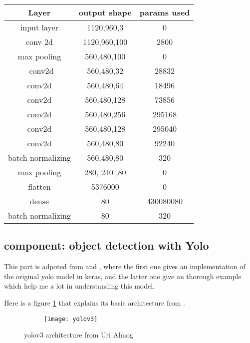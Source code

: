 \documentclass{article}
\begin{document}
\begin{center}
    \begin{tabular}{ccc}
        \hline
        Layer & output shape & params used\\
        \hline 
        input layer & 1120,960,3 & 0\\
        conv 2d & 1120,960,100 & 2800\\
        max pooling & 560,480,100 & 0\\\
        conv2d & 560,480,32& 28832\\
        conv2d & 560,480,64 & 18496\\
        conv2d & 560,480,128 & 73856\\
        conv2d & 560,480,256 & 295168\\
        conv2d & 560,480,128& 295040\\
        conv2d & 560,480,80 & 92240\\
        batch normalizing & 560,480,80 & 320\\
        max pooling & 280, 240 ,80 & 0\\
        flatten & 5376000 & 0\\
        dense & 80 & 430080080 \\
        batch normalizing & 80 & 320       \\\hline
    \end{tabular}
\end{center}

\subsection{component: object detection with Yolo}

This part is adpoted from \cite{anh_yolo3_2022} and \cite{brownlee_how_2019}, where the first one gives an implementation of the original yolo model in keras, and the latter one give an thorough example which help me a lot in understanding this model.

Here is a figure \ref{fig:yolov3} that explains its basic architecture from \cite{almog_yolo_2020}.

\begin{figure}[h!]
    \centering
    \begin{subfigure}{.70\textwidth}
        \centering
        \texttt{[image: yolov3]}
    \end{subfigure}
    \caption{yolov3 architecture from Uri Almog}
    \label{fig:yolov3}
\end{figure}
\end{document}
